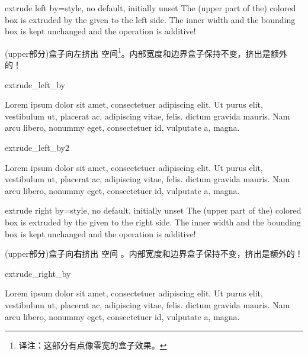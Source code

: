 \begin{docTcbKey}[][doc updated=2014-09-19]{extrude left by}{=}{style, no default, initially unset}
The (upper part of the) colored box is extruded by the given  to the left side.
The inner width and the bounding box is kept unchanged and the operation
is additive!

(upper部分)盒子向左挤出  空间\footnote{译注：这部分有点像零宽的盒子效果。}。内部宽度和边界盒子保持不变，挤出是额外的！
\begin{exdispExample}{extrude_left_by}

Lorem ipsum dolor sit amet, consectetuer adipiscing elit. Ut purus elit,
vestibulum ut, placerat ac, adipiscing vitae, felis.
 dictum gravida mauris.
Nam arcu libero, nonummy eget, consectetuer id, vulputate a, magna.
\end{exdispExample}

\begin{exdispExample}{extrude_left_by2}

Lorem ipsum dolor sit amet, consectetuer adipiscing elit. Ut purus elit,
vestibulum ut, placerat ac, adipiscing vitae, felis.
 dictum gravida mauris.
Nam arcu libero, nonummy eget, consectetuer id, vulputate a, magna.
\end{exdispExample}

\end{docTcbKey}

\begin{docTcbKey}[][doc updated=2014-09-19]{extrude right by}{=}{style, no default, initially unset}
The (upper part of the) colored box is extruded by the given  to the right side.
The inner width and the bounding box is kept unchanged and the operation
is additive!

(upper部分)盒子向{\bf 右}挤出  空间%
。内部宽度和边界盒子保持不变，挤出是额外的！
\begin{exdispExample}{extrude_right_by}

Lorem ipsum dolor sit amet, consectetuer adipiscing elit. Ut purus elit,
vestibulum ut, placerat ac, adipiscing vitae, felis.
 dictum gravida mauris.
Nam arcu libero, nonummy eget, consectetuer id, vulputate a, magna.
\end{exdispExample}
\end{docTcbKey}

